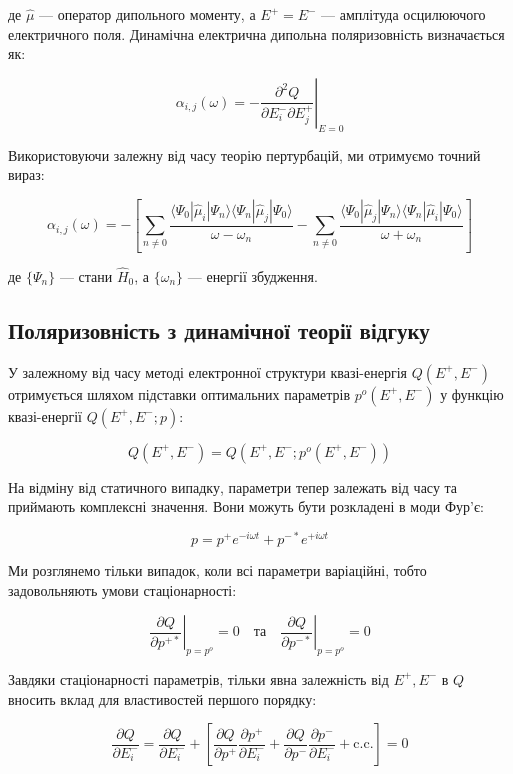 \documentclass{PySCFBook}
\begin{document}
де \(\hat{\mu}\) — оператор дипольного моменту, а \(E^+ = E^-\) — амплітуда осцилюючого електричного поля. Динамічна електрична дипольна поляризовність визначається як:

\[\alpha_{i,j}(\omega) = -\left. \frac{\partial^2 Q}{\partial E^-_i \partial E^+_j} \right|_{E=0}\]

Використовуючи залежну від часу теорію пертурбацій, ми отримуємо точний вираз:

\[\alpha_{i,j}(\omega) = -\left[ \sum_{n \neq 0} \frac{\langle \Psi_0 | \hat{\mu}_i | \Psi_n \rangle \langle \Psi_n | \hat{\mu}_j | \Psi_0 \rangle}{\omega - \omega_n} - \sum_{n \neq 0} \frac{\langle \Psi_0 | \hat{\mu}_j | \Psi_n \rangle \langle \Psi_n | \hat{\mu}_i | \Psi_0 \rangle}{\omega + \omega_n} \right]\]

де \(\{\Psi_n\}\) — стани \(\hat{H}_0\), а \(\{\omega_n\}\) — енергії збудження.

\subsection{Поляризовність з динамічної теорії відгуку}

У залежному від часу методі електронної структури квазі-енергія \(Q(E^+, E^-)\) отримується шляхом підставки оптимальних параметрів \(p^o(E^+, E^-)\) у функцію квазі-енергії \(Q(E^+, E^-; p)\):

\[Q(E^+, E^-) = Q(E^+, E^-; p^o(E^+, E^-))\]

На відміну від статичного випадку, параметри тепер залежать від часу та приймають комплексні значення. Вони можуть бути розкладені в моди Фур'є:

\[p = p^+ e^{-i \omega t} + p^{-*} e^{+i \omega t}\]

Ми розглянемо тільки випадок, коли всі параметри варіаційні, тобто задовольняють умови стаціонарності:

\[\left. \frac{\partial Q}{\partial p^{+*}} \right|_{p=p^o} = 0 \quad \text{та} \quad \left. \frac{\partial Q}{\partial p^{-*}} \right|_{p=p^o} = 0\]

Завдяки стаціонарності параметрів, тільки явна залежність від \(E^+, E^-\) в \(Q\) вносить вклад для властивостей першого порядку:

\[\frac{\partial Q}{\partial E^-_i} = \frac{\partial Q}{\partial E^-_i} + \left[ \frac{\partial Q}{\partial p^+} \frac{\partial p^+}{\partial E^-_i} + \frac{\partial Q}{\partial p^-} \frac{\partial p^-}{\partial E^-_i} + \text{c.c.} \right] = 0\]
\end{document}
